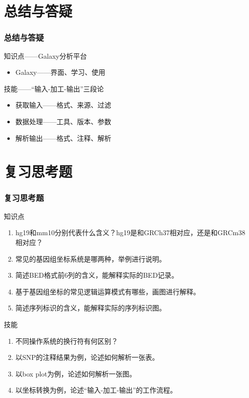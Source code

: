 \section{总结与答疑}
\begin{frame}
  \frametitle{总结与答疑}
  \begin{block}{知识点——Galaxy分析平台}
    \begin{itemize}
      \item Galaxy——界面、学习、使用
    \end{itemize}
  \end{block}
  \begin{block}{技能——“输入-加工-输出”三段论}
    \begin{itemize}
      \item 获取输入——格式、来源、过滤
      \item 数据处理——工具、版本、参数
      \item 解析输出——格式、注释、解析
    \end{itemize}
  \end{block}
\end{frame}

\section{复习思考题}
\begin{frame}
  \frametitle{复习思考题}
  \begin{block}{知识点}
    \begin{enumerate}
      \item hg19和mm10分别代表什么含义？hg19是和GRCh37相对应，还是和GRCm38相对应？
      \item 常见的基因组坐标系统是哪两种，举例进行说明。
      \item 简述BED格式前6列的含义，能解释实际的BED记录。
      \item 基于基因组坐标的常见逻辑运算模式有哪些，画图进行解释。
      \item 简述序列标识的含义，能解释实际的序列标识图。
    \end{enumerate}
  \end{block}
  \begin{block}{技能}
    \begin{enumerate}
      \item 不同操作系统的换行符有何区别？
      \item 以SNP的注释结果为例，论述如何解析一张表。
      \item 以box plot为例，论述如何解析一张图。
      \item 以坐标转换为例，论述“输入-加工-输出”的工作流程。
    \end{enumerate}
  \end{block}
\end{frame}
